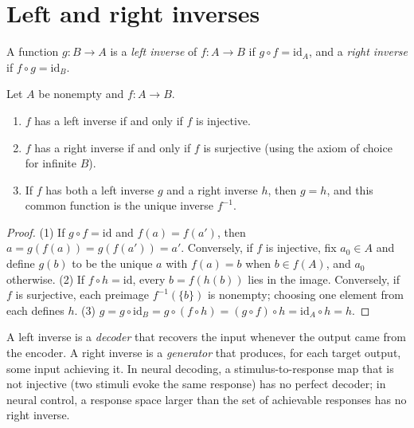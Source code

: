 \section{Left and right inverses}
A function $g:B\to A$ is a \emph{left inverse} of $f:A\to B$ if $g\circ f=\mathrm{id}_A$, and a \emph{right inverse} if $f\circ g=\mathrm{id}_B$.

\begin{theorem}
Let $A$ be nonempty and $f:A\to B$.
\begin{enumerate}[leftmargin=2em]
\item $f$ has a left inverse if and only if $f$ is injective.
\item $f$ has a right inverse if and only if $f$ is surjective (using the axiom of choice for infinite $B$).
\item If $f$ has both a left inverse $g$ and a right inverse $h$, then $g=h$, and this common function is the unique inverse $f^{-1}$.
\end{enumerate}
\end{theorem}
\begin{proof}
(1) If $g\circ f=\mathrm{id}$ and $f(a)=f(a')$, then $a=g(f(a))=g(f(a'))=a'$. Conversely, if $f$ is injective, fix $a_0\in A$ and define $g(b)$ to be the unique $a$ with $f(a)=b$ when $b\in f(A)$, and $a_0$ otherwise. (2) If $f\circ h=\mathrm{id}$, every $b=f(h(b))$ lies in the image. Conversely, if $f$ is surjective, each preimage $f^{-1}(\{b\})$ is nonempty; choosing one element from each defines $h$. (3) $g=g\circ\mathrm{id}_B=g\circ(f\circ h)=(g\circ f)\circ h=\mathrm{id}_A\circ h=h$.
\end{proof}

A left inverse is a \emph{decoder} that recovers the input whenever the output came from the encoder. A right inverse is a \emph{generator} that produces, for each target output, some input achieving it. In neural decoding, a stimulus-to-response map that is not injective (two stimuli evoke the same response) has no perfect decoder; in neural control, a response space larger than the set of achievable responses has no right inverse.

